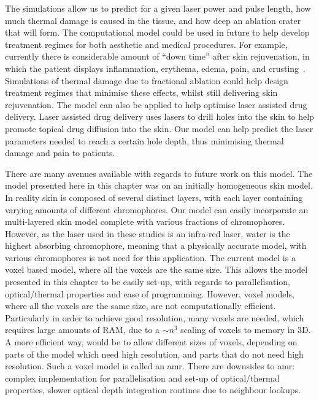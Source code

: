The simulations allow us to predict for a given laser power and pulse length, how much thermal damage is caused in the tissue, and how deep an ablation crater that will form. The computational model could be used in future to help develop treatment regimes for both aesthetic and medical procedures. For example, currently there is considerable amount of ``down time'' after skin rejuvenation, in which the patient displays inflammation, erythema, edema, pain, and crusting~\cite{lapidoth2014fractional,trelles2011safe,kohl2015fractional}. Simulations of thermal damage due to fractional ablation could help design treatment regimes that minimise these effects, whilst still delivering skin rejuvenation.
The model can also be applied to help optimise laser assisted drug delivery. 
Laser assisted drug delivery uses lasers to drill holes into the skin to help promote topical drug diffusion into the skin.
Our model can help predict the laser parameters needed to reach a certain hole depth, thus minimising thermal damage and pain to patients.

There are many avenues available with regards to future work on this model. The model presented here in this chapter was on an initially homogeneous skin model. In reality skin is composed of several distinct layers, with each layer containing varying amounts of different chromophores. Our model can easily incorporate an multi-layered skin model complete with various fractions of chromophores. However, as the laser used in these studies is an infra-red laser, water is the highest absorbing chromophore, meaning that a physically accurate model, with various chromophores is not need for this application.
The current model is a voxel based model, where all the voxels are the same size. This allows the model presented in this chapter to be easily set-up, with regards to parallelisation, optical/thermal properties and ease of programming. However, voxel models, where all the voxels are the same size, are not computationally efficient. Particularly in order to achieve good resolution, many voxels are needed, which requires large amounts of RAM, due to a $\sim n^3$ scaling of voxels to memory in 3D. A more efficient way, would be to allow different sizes of voxels, depending on parts of the model which need high resolution, and parts that do not need high resolution. Such a voxel model is called an \gls*{amr}. There are downsides to \gls*{amr}: complex implementation for parallelisation and set-up of optical/thermal properties, slower optical depth integration routines due to neighbour lookups.


